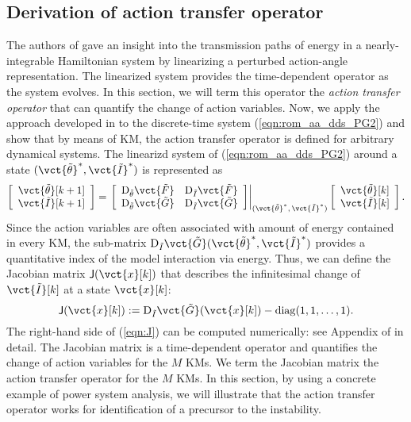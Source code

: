 \documentclass[a4paper,10pt]{article}
\begin{document}
\subsection{Derivation of action transfer operator} 
\label{sec:3-C}

The authors of \cite{Eisenhower_CDC07} gave an insight into the transmission paths of energy in a nearly-integrable Hamiltonian system by linearizing a perturbed action-angle representation. 
The linearized system provides the time-dependent operator as the system evolves.  
In this section, we will term this operator the \emph{action transfer operator} that can quantify the change of action variables.  
Now, we apply the approach developed in \cite{Eisenhower_CDC07} to the discrete-time system (\ref{eqn:rom_aa_dds_PG2}) and show that by means of KM, the action transfer operator is defined for arbitrary dynamical systems.  
The linearizd system of (\ref{eqn:rom_aa_dds_PG2}) around a state $(\vct{\tilde{\theta}}^\ast,\vct{\tilde{I}}^\ast)$ is represented as
\begin{equation}
\left[
\begin{array}{c}
\vct{\tilde{\theta}}[k+1]\\
\vct{\tilde{I}}[k+1]
\end{array}
\right]
=
\left.
\left[
\begin{array}{cc}
\mathrm{D}_{\tilde{\theta}}\vct{\tilde{F}} & \mathrm{D}_{\tilde{I}}\vct{\tilde{F}}\\
\mathrm{D}_{\tilde{\theta}}\vct{\tilde{G}} & \mathrm{D}_{\tilde{I}}\vct{\tilde{G}}
\end{array}
\right]
\right\vert_{(\vct{\tilde{\theta}}^\ast,\,\vct{\tilde{I}}^\ast)}
\left[
\begin{array}{cc}
\vct{\tilde{\theta}}[k]\\
\vct{\tilde{I}}[k]
\end{array}
\right].
\nonumber
\end{equation}
Since the action variables are often associated with amount of energy contained in every KM, the sub-matrix $\mathrm{D}_{\tilde{I}}\vct{\tilde{G}}(\vct{\tilde{\theta}}^\ast,\vct{\tilde{I}}^\ast)$ provides a quantitative index of the model interaction via energy.  
Thus, we can define the Jacobian matrix $\mathsf{J}(\vct{x}[k])$ that describes the infinitesimal change of $\vct{\tilde{I}}[k]$ at a state $\vct{x}[k]$:
\begin{equation}
{\sf J}(\vct{x}[k]):=\mathrm{D}_{\tilde{I}}\vct{\tilde{G}}(\vct{x}[k])-\mathrm{diag}(1,1,\ldots,1).
\label{eqn:J}
\end{equation}
The right-hand side of (\ref{eqn:J}) can be computed numerically: see Appendix of \cite{Susuki_IEEETPWRS27} in detail.  
The Jacobian matrix is a time-dependent operator and quantifies the change of action variables for the $M$ KMs.  
We term the Jacobian matrix the action transfer operator for the $M$ KMs.  
In this section, by using a concrete example of power system analysis, we will illustrate that the action transfer operator works for identification of a precursor to the instability.  
\end{document}

